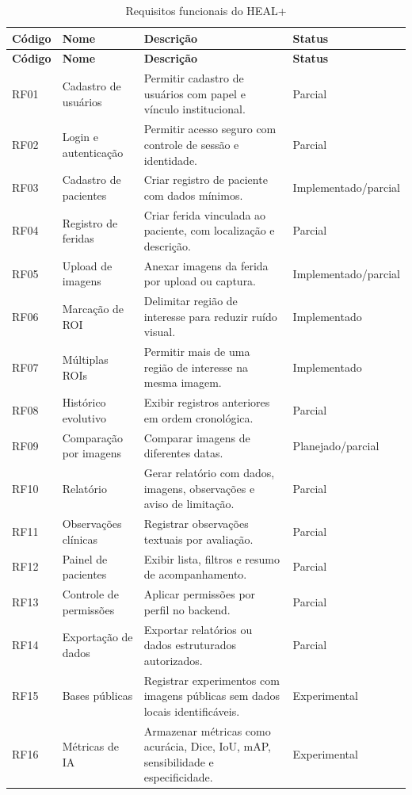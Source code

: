 \documentclass[
    12pt,
    oneside,
    a4paper,
    chapter=TITLE,
    brazil,
    sumario=tradicional,
    hidelinks
]{abntex2}
\begin{document}
\begin{longtable}{L{1.6cm}L{3.2cm}L{6.6cm}L{2.4cm}}
\caption{\label{tab:requisitos-funcionais}Requisitos funcionais do HEAL+}\\
\toprule
\textbf{Código} & \textbf{Nome} & \textbf{Descrição} & \textbf{Status} \\
\midrule
\endfirsthead
\toprule
\textbf{Código} & \textbf{Nome} & \textbf{Descrição} & \textbf{Status} \\
\midrule
\endhead
RF01 & Cadastro de usuários & Permitir cadastro de usuários com papel e vínculo institucional. & Parcial \\
RF02 & Login e autenticação & Permitir acesso seguro com controle de sessão e identidade. & Parcial \\
RF03 & Cadastro de pacientes & Criar registro de paciente com dados mínimos. & Implementado/parcial \\
RF04 & Registro de feridas & Criar ferida vinculada ao paciente, com localização e descrição. & Parcial \\
RF05 & Upload de imagens & Anexar imagens da ferida por upload ou captura. & Implementado/parcial \\
RF06 & Marcação de ROI & Delimitar região de interesse para reduzir ruído visual. & Implementado \\
RF07 & Múltiplas ROIs & Permitir mais de uma região de interesse na mesma imagem. & Implementado \\
RF08 & Histórico evolutivo & Exibir registros anteriores em ordem cronológica. & Parcial \\
RF09 & Comparação por imagens & Comparar imagens de diferentes datas. & Planejado/parcial \\
RF10 & Relatório & Gerar relatório com dados, imagens, observações e aviso de limitação. & Parcial \\
RF11 & Observações clínicas & Registrar observações textuais por avaliação. & Parcial \\
RF12 & Painel de pacientes & Exibir lista, filtros e resumo de acompanhamento. & Parcial \\
RF13 & Controle de permissões & Aplicar permissões por perfil no backend. & Parcial \\
RF14 & Exportação de dados & Exportar relatórios ou dados estruturados autorizados. & Parcial \\
RF15 & Bases públicas & Registrar experimentos com imagens públicas sem dados locais identificáveis. & Experimental \\
RF16 & Métricas de IA & Armazenar métricas como acurácia, Dice, IoU, mAP, sensibilidade e especificidade. & Experimental \\

\end{longtable}
\end{document}
